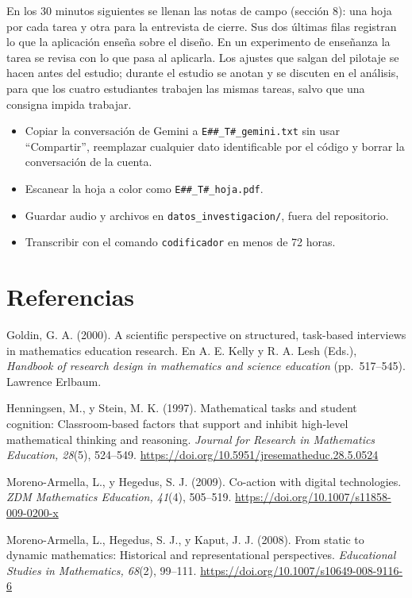 \documentclass[11pt,letterpaper]{article}
\newcommand{\cas}{$\square$}
\begin{document}
En los 30 minutos siguientes se llenan las notas de campo (sección 8): una hoja por cada tarea y otra para la entrevista de cierre. Sus dos últimas filas registran lo que la aplicación enseña sobre el diseño. En un experimento de enseñanza la tarea se revisa con lo que pasa al aplicarla. Los ajustes que salgan del pilotaje se hacen antes del estudio; durante el estudio se anotan y se discuten en el análisis, para que los cuatro estudiantes trabajen las mismas tareas, salvo que una consigna impida trabajar.

\begin{itemize}[label=\cas]
  \item Copiar la conversación de Gemini a \texttt{E\#\#\_T\#\_gemini.txt} sin usar ``Compartir'', reemplazar cualquier dato identificable por el código y borrar la conversación de la cuenta.
  \item Escanear la hoja a color como \texttt{E\#\#\_T\#\_hoja.pdf}.
  \item Guardar audio y archivos en \texttt{datos\_investigacion/}, fuera del repositorio.
  \item Transcribir con el comando \texttt{codificador} en menos de 72 horas.
\end{itemize}


\section*{Referencias}
\small
\setlength{\parindent}{-1.2em}\setlength{\leftskip}{1.2em}

Goldin, G. A. (2000). A scientific perspective on structured, task-based interviews in mathematics education research. En A. E. Kelly y R. A. Lesh (Eds.), \emph{Handbook of research design in mathematics and science education} (pp.~517--545). Lawrence Erlbaum.

Henningsen, M., y Stein, M. K. (1997). Mathematical tasks and student cognition: Classroom-based factors that support and inhibit high-level mathematical thinking and reasoning. \emph{Journal for Research in Mathematics Education, 28}(5), 524--549. \url{https://doi.org/10.5951/jresematheduc.28.5.0524}

Moreno-Armella, L., y Hegedus, S. J. (2009). Co-action with digital technologies. \emph{ZDM Mathematics Education, 41}(4), 505--519. \url{https://doi.org/10.1007/s11858-009-0200-x}

Moreno-Armella, L., Hegedus, S. J., y Kaput, J. J. (2008). From static to dynamic mathematics: Historical and representational perspectives. \emph{Educational Studies in Mathematics, 68}(2), 99--111. \url{https://doi.org/10.1007/s10649-008-9116-6}
\end{document}
